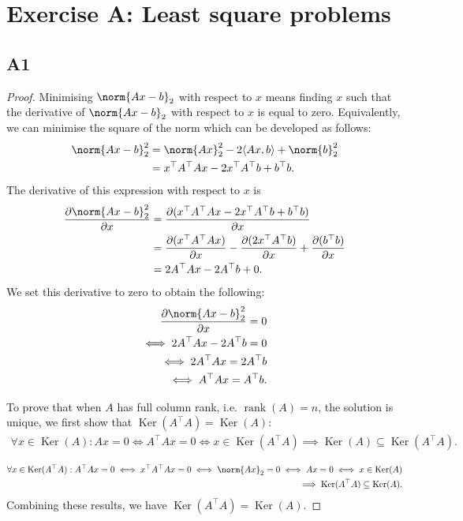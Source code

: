 \documentclass[11pt]{article}
\DeclareMathOperator{\rank}{rank}
\DeclareMathOperator{\Ker}{Ker}
\newcommand{\snorm}[1]{\norm{#1}_2} %
\begin{document}
\section*{Exercise A: Least square problems}
\subsection*{A1}
\begin{proof}
Minimising $\snorm{Ax - b}$ with respect to \(x\) means finding \(x\) such that the derivative of $\snorm{Ax - b}$ with respect to \(x\) is equal to zero.
Equivalently, we can minimise the square of the norm which can be developed as follows:
\begin{align*}
    \snorm{Ax - b}^2 &= \snorm{Ax}^2 - 2 \langle Ax,b \rangle + \snorm{b}^2 \\
    &= x^\top A^\top Ax - 2x^\top A^\top b + b^\top b. 
\end{align*}
The derivative of this expression with respect to \(x\) is
\begin{align*}
    \frac{\partial \snorm{Ax - b}^2}{\partial x} &= \frac{\partial(x^\top A^\top Ax - 2x^\top A^\top b + b^\top b)}{\partial x} \\
    &= \frac{\partial(x^\top A^\top Ax)}{\partial x} - \frac{\partial(2x^\top A^\top b)}{\partial x} + \frac{\partial(b^\top b)}{\partial x} \\
    &= 2A^\top Ax - 2A^\top b + 0.
\end{align*}
We set this derivative to zero to obtain the following:
\begin{align*}
    \frac{\partial \snorm{Ax - b}^2}{\partial x} = 0\\
    \iff 2A^\top Ax - 2A^\top b = 0 \\
    \iff 2A^\top Ax = 2A^\top b \\
    \iff A^\top Ax = A^\top b.
\end{align*}

To prove that when \(A\) has full column rank, i.e. \(\rank(A)=n\), the solution is unique, we first show that \(\Ker(A^\top A) = \Ker(A)\):
\begin{align*}
    \forall x \in \Ker(A): Ax = 0 \iff A^\top Ax = 0 \iff x \in \Ker(A^\top A) \implies \Ker(A) \subseteq \Ker(A^\top A).
\end{align*}

\begin{align*}
    \forall x \in \Ker(A^\top A): A^\top Ax = 0 \iff x^\top A^\top Ax = 0 \iff \snorm{Ax} = 0 \iff Ax = 0 \iff x \in \Ker(A) \\
    \implies \Ker(A^\top A) \subseteq \Ker(A).
\end{align*}
Combining these results, we have \(\Ker(A^\top A) = \Ker(A)\).


\end{proof}
\end{document}
